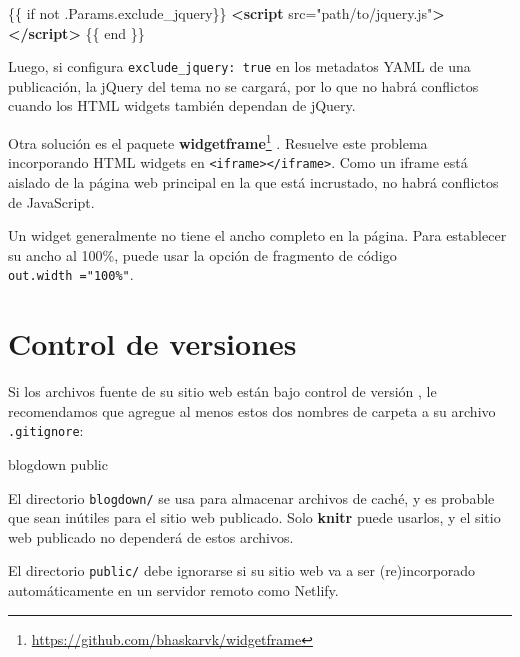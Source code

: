 \documentclass[12pt,]{krantz}
\makeatletter
\newenvironment{Shaded}{\begin{snugshade}}{\end{snugshade}}
\newcommand{\ExtensionTok}[1]{#1}
\newcommand{\KeywordTok}[1]{\textcolor[rgb]{0.13,0.29,0.53}{\textbf{#1}}}
\newcommand{\NormalTok}[1]{#1}
\newcommand{\OtherTok}[1]{\textcolor[rgb]{0.56,0.35,0.01}{#1}}
\newcommand{\StringTok}[1]{\textcolor[rgb]{0.31,0.60,0.02}{#1}}
\renewcommand{\href}[2]{#2\footnote{\url{#1}}}
\newenvironment{kframe}{%
\medskip{}
\setlength{\fboxsep}{.8em}
 \def\at@end@of@kframe{}%
 \ifinner\ifhmode%
  \def\at@end@of@kframe{\end{minipage}}%
  \begin{minipage}{\columnwidth}%
 \fi\fi%
 \def\FrameCommand##1{\hskip\@totalleftmargin \hskip-\fboxsep
 \colorbox{shadecolor}{##1}\hskip-\fboxsep
     \hskip-\linewidth \hskip-\@totalleftmargin \hskip\columnwidth}%
 \MakeFramed {\advance\hsize-\width
   \@totalleftmargin\z@ \linewidth\hsize
   \@setminipage}}%
 {\par\unskip\endMakeFramed%
 \at@end@of@kframe}
\renewenvironment{Shaded}{\begin{kframe}}{\end{kframe}}
\theoremstyle{definition}
\theoremstyle{definition}
\theoremstyle{definition}
\theoremstyle{remark}
\makeatother
\begin{document}
\begin{Shaded}
\begin{Highlighting}[]
\NormalTok{\{\{ if not .Params.exclude_jquery\}\}}
\KeywordTok{<script}\OtherTok{ src=}\StringTok{"path/to/jquery.js"}\KeywordTok{></script>}
\NormalTok{\{\{ end \}\}}
\end{Highlighting}
\end{Shaded}

Luego, si configura \texttt{exclude\_jquery:\ true} en los metadatos
YAML de una publicación, la jQuery del tema no se cargará, por lo que no
habrá conflictos cuando los HTML widgets también dependan de jQuery.

Otra solución es el paquete
\href{https://github.com/bhaskarvk/widgetframe}{\textbf{widgetframe}}
\citep{R-widgetframe}. Resuelve este problema incorporando HTML widgets
en
\texttt{\textless{}iframe\textgreater{}\textless{}/iframe\textgreater{}}.
Como un iframe está aislado de la página web principal en la que está
incrustado, no habrá conflictos de JavaScript.

Un widget generalmente no tiene el ancho completo en la página. Para
establecer su ancho al 100\%, puede usar la opción de fragmento de
código \texttt{out.width\ ="100\%"}.

\hypertarget{control-de-versiones}{%
\section{Control de versiones}\label{control-de-versiones}}

Si los archivos fuente de su sitio web están bajo control de versión
, le recomendamos que agregue al menos estos
dos nombres de carpeta a su archivo \texttt{.gitignore}:

\begin{Shaded}
\begin{Highlighting}[]
\ExtensionTok{blogdown}
\ExtensionTok{public}
\end{Highlighting}
\end{Shaded}

El directorio \texttt{blogdown/} se usa para almacenar archivos de
caché, y es probable que sean inútiles para el sitio web publicado. Solo
\textbf{knitr} puede usarlos, y el sitio web publicado no dependerá de
estos archivos.

El directorio \texttt{public/} debe ignorarse si su sitio web va a ser
(re)incorporado automáticamente en un servidor remoto como Netlify.
\end{document}
